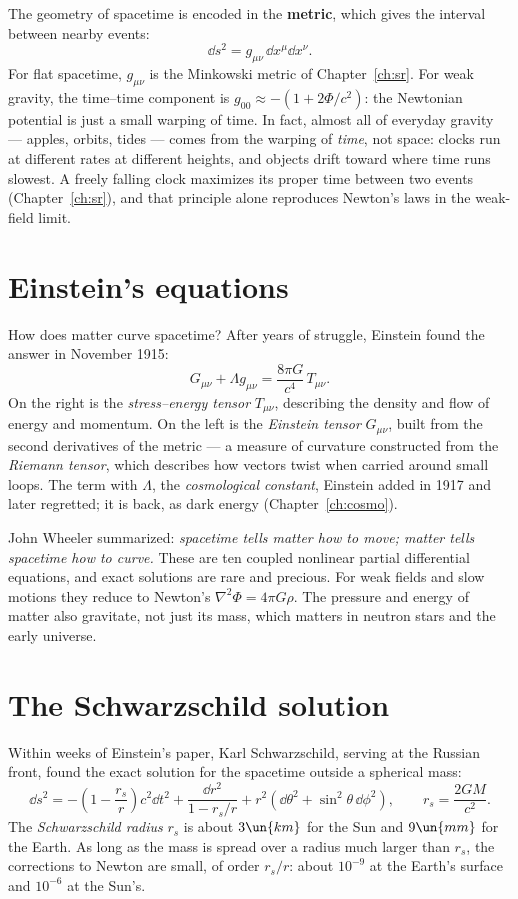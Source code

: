 The geometry of spacetime is encoded in the \textbf{metric}, which gives the interval between nearby events:
\[
  \dd s^2 = g_{\mu\nu}\,\dd x^\mu\dd x^\nu .
\]
For flat spacetime, $g_{\mu\nu}$ is the Minkowski metric of Chapter~\ref{ch:sr}. For weak gravity, the time--time component is $g_{00}\approx-(1+2\Phi/c^2)$: the Newtonian potential is just a small warping of time. In fact, almost all of everyday gravity --- apples, orbits, tides --- comes from the warping of \emph{time}, not space: clocks run at different rates at different heights, and objects drift toward where time runs slowest. A freely falling clock maximizes its proper time between two events (Chapter~\ref{ch:sr}), and that principle alone reproduces Newton's laws in the weak-field limit.

\section{Einstein's equations}

How does matter curve spacetime? After years of struggle, Einstein found the answer in November 1915:
\[
  G_{\mu\nu} + \Lambda g_{\mu\nu} = \frac{8\pi G}{c^4}\,T_{\mu\nu} .
\]
On the right is the \emph{stress--energy tensor} $T_{\mu\nu}$, describing the density and flow of energy and momentum. On the left is the \emph{Einstein tensor} $G_{\mu\nu}$, built from the second derivatives of the metric --- a measure of curvature constructed from the \emph{Riemann tensor}, which describes how vectors twist when carried around small loops. The term with $\Lambda$, the \emph{cosmological constant}, Einstein added in 1917 and later regretted; it is back, as dark energy (Chapter~\ref{ch:cosmo}).

John Wheeler summarized: \emph{spacetime tells matter how to move; matter tells spacetime how to curve.} These are ten coupled nonlinear partial differential equations, and exact solutions are rare and precious. For weak fields and slow motions they reduce to Newton's $\nabla^2\Phi = 4\pi G\rho$. The pressure and energy of matter also gravitate, not just its mass, which matters in neutron stars and the early universe.

\section{The Schwarzschild solution}

Within weeks of Einstein's paper, Karl Schwarzschild, serving at the Russian front, found the exact solution for the spacetime outside a spherical mass:
\[
  \dd s^2 = -\left(1-\frac{r_s}{r}\right)c^2\dd t^2 + \frac{\dd r^2}{1 - r_s/r} + r^2\left(\dd\theta^2 + \sin^2\theta\,\dd\phi^2\right),
  \qquad r_s = \frac{2GM}{c^2}.
\]
The \emph{Schwarzschild radius} $r_s$ is about $3\un{km}$ for the Sun and $9\un{mm}$ for the Earth. As long as the mass is spread over a radius much larger than $r_s$, the corrections to Newton are small, of order $r_s/r$: about $10^{-9}$ at the Earth's surface and $10^{-6}$ at the Sun's.


